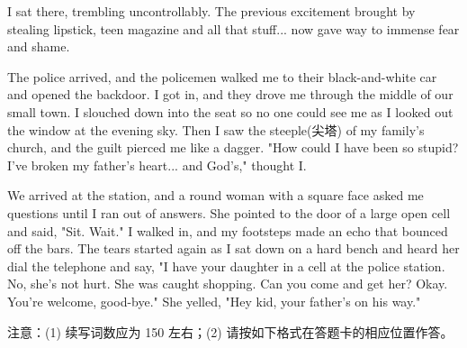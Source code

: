 \documentclass{英语试卷}
\begin{document}
\par I sat there, trembling uncontrollably. The previous excitement brought by stealing lipstick, teen magazine and all that stuff... now gave way to immense fear and shame.\par
\par The police arrived, and the policemen walked me to their black-and-white car and opened the backdoor. I got in, and they drove me through the middle of our small town. I slouched down into the seat so no one could see me as I looked out the window at the evening sky. Then I saw the steeple(尖塔) of my family's church, and the guilt pierced me like a dagger. "How could I have been so stupid? I've broken my father's heart... and God's," thought I.\par
\par We arrived at the station, and a round woman with a square face asked me questions until I ran out of answers. She pointed to the door of a large open cell and said, "Sit. Wait." I walked in, and my footsteps made an echo that bounced off the bars. The tears started again as I sat down on a hard bench and heard her dial the telephone and say, "I have your daughter in a cell at the police station. No, she's not hurt. She was caught shopping. Can you come and get her? Okay. You're welcome, good-bye." She yelled, "Hey kid, your father's on his way."\par
\par 注意：(1) 续写词数应为 150 左右；(2) 请按如下格式在答题卡的相应位置作答。\par
{}
\end{document}
